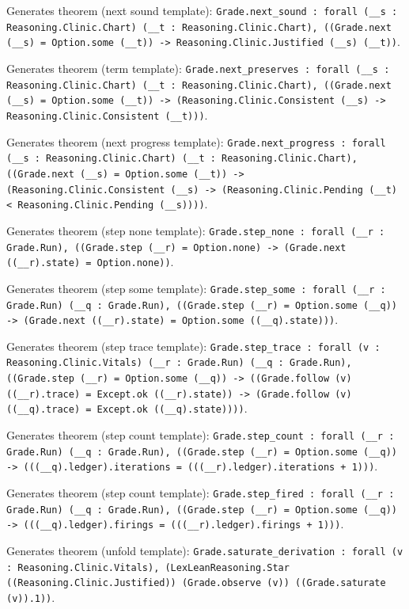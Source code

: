\documentclass[11pt]{article}
\begin{document}
\noindent Generates theorem (next sound template): \texttt{Grade.next\_sound : forall (\_\_s : Reasoning.Clinic.Chart) (\_\_t : Reasoning.Clinic.Chart), ((Grade.next (\_\_s) = Option.some (\_\_t)) -> Reasoning.Clinic.Justified (\_\_s) (\_\_t))}.\par
\noindent Generates theorem (term template): \texttt{Grade.next\_preserves : forall (\_\_s : Reasoning.Clinic.Chart) (\_\_t : Reasoning.Clinic.Chart), ((Grade.next (\_\_s) = Option.some (\_\_t)) -> (Reasoning.Clinic.Consistent (\_\_s) -> Reasoning.Clinic.Consistent (\_\_t)))}.\par
\noindent Generates theorem (next progress template): \texttt{Grade.next\_progress : forall (\_\_s : Reasoning.Clinic.Chart) (\_\_t : Reasoning.Clinic.Chart), ((Grade.next (\_\_s) = Option.some (\_\_t)) -> (Reasoning.Clinic.Consistent (\_\_s) -> (Reasoning.Clinic.Pending (\_\_t) < Reasoning.Clinic.Pending (\_\_s))))}.\par
\noindent Generates theorem (step none template): \texttt{Grade.step\_none : forall (\_\_r : Grade.Run), ((Grade.step (\_\_r) = Option.none) -> (Grade.next ((\_\_r).state) = Option.none))}.\par
\noindent Generates theorem (step some template): \texttt{Grade.step\_some : forall (\_\_r : Grade.Run) (\_\_q : Grade.Run), ((Grade.step (\_\_r) = Option.some (\_\_q)) -> (Grade.next ((\_\_r).state) = Option.some ((\_\_q).state)))}.\par
\noindent Generates theorem (step trace template): \texttt{Grade.step\_trace : forall (v : Reasoning.Clinic.Vitals) (\_\_r : Grade.Run) (\_\_q : Grade.Run), ((Grade.step (\_\_r) = Option.some (\_\_q)) -> ((Grade.follow (v) ((\_\_r).trace) = Except.ok ((\_\_r).state)) -> (Grade.follow (v) ((\_\_q).trace) = Except.ok ((\_\_q).state))))}.\par
\noindent Generates theorem (step count template): \texttt{Grade.step\_count : forall (\_\_r : Grade.Run) (\_\_q : Grade.Run), ((Grade.step (\_\_r) = Option.some (\_\_q)) -> (((\_\_q).ledger).iterations = (((\_\_r).ledger).iterations + 1)))}.\par
\noindent Generates theorem (step count template): \texttt{Grade.step\_fired : forall (\_\_r : Grade.Run) (\_\_q : Grade.Run), ((Grade.step (\_\_r) = Option.some (\_\_q)) -> (((\_\_q).ledger).firings = (((\_\_r).ledger).firings + 1)))}.\par
\noindent Generates theorem (unfold template): \texttt{Grade.saturate\_derivation : forall (v : Reasoning.Clinic.Vitals), (LexLeanReasoning.Star ((Reasoning.Clinic.Justified)) (Grade.observe (v)) ((Grade.saturate (v)).1))}.\par
\end{document}
